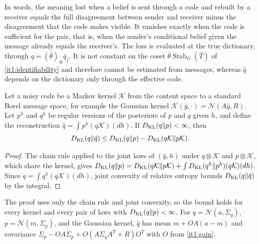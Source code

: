In words, the meaning lost when a belief is sent through a code and rebuilt by a receiver equals the full disagreement between sender and receiver minus the disagreement that the code makes visible. It vanishes exactly when the code is sufficient for the pair, that is, when the sender's conditional belief given the message already equals the receiver's. The loss is evaluated at the true dictionary, through $q=(\bar\theta)_\#\bar q_j$. It is not constant on the coset $\bar\theta\operatorname{Stab}_G(\bar T)$ of \cref{it1:identifiability} and therefore cannot be estimated from messages, whereas $\hat q$ depends on the dictionary only through the effective code.

Let a noisy code be a Markov kernel $\mathcal K$ from the content space to a standard Borel message space, for example the Gaussian kernel $\mathcal K(\bar y,\cdot)=\mathcal N(A\bar y,R)$. Let $p^h$ and $q^h$ be regular versions of the posteriors of $p$ and $q$ given $h$, and define the reconstruction $\hat q=\int p^h(q\mathcal K)(dh)$. If $D_{\mathrm{KL}}(q\Vert p)<\infty$, then
\begin{equation}
D_{\mathrm{KL}}(q\Vert\hat q)\leq D_{\mathrm{KL}}(q\Vert p)-D_{\mathrm{KL}}(q\mathcal K\Vert p\mathcal K).
\label{it1:noisy-eq}
\end{equation}
\begin{proof}
The chain rule applied to the joint laws of $(\bar y,h)$ under $q\otimes\mathcal K$ and $p\otimes\mathcal K$, which share the kernel, gives $D_{\mathrm{KL}}(q\Vert p)=D_{\mathrm{KL}}(q\mathcal K\Vert p\mathcal K)+\int D_{\mathrm{KL}}(q^h\Vert p^h)(q\mathcal K)(dh)$. Since $q=\int q^h(q\mathcal K)(dh)$, joint convexity of relative entropy bounds $D_{\mathrm{KL}}(q\Vert\hat q)$ by the integral.
\end{proof}

The proof uses only the chain rule and joint convexity, so the bound holds for every kernel and every pair of laws with $D_{\mathrm{KL}}(q\Vert p)<\infty$. For $q=\mathcal N(a,\Sigma_q)$, $p=\mathcal N(m,\Sigma_p)$, and the Gaussian kernel, $\hat q$ has mean $m+OA(a-m)$ and covariance $\Sigma_p-OA\Sigma_p+O(A\Sigma_qA^T+R)O^T$ with $O$ from \cref{it1:gain}.

